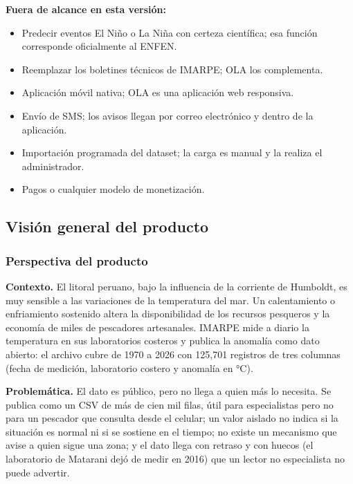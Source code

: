 \documentclass[11pt,a4paper,oneside]{article}
\begin{document}
\textbf{Fuera de alcance en esta versión:}



\begin{itemize}[leftmargin=1.4em, itemsep=2pt]
\item Predecir eventos El Niño o La Niña con certeza científica; esa función corresponde oficialmente al ENFEN.
\item Reemplazar los boletines técnicos de IMARPE; OLA los complementa.
\item Aplicación móvil nativa; OLA es una aplicación web responsiva.
\item Envío de SMS; los avisos llegan por correo electrónico y dentro de la aplicación.
\item Importación programada del dataset; la carga es manual y la realiza el administrador.
\item Pagos o cualquier modelo de monetización.
\end{itemize}


\subsection{Visión general del producto}

\subsubsection{Perspectiva del producto}

\textbf{Contexto.} El litoral peruano, bajo la influencia de la corriente de Humboldt, es muy sensible a las variaciones de la temperatura del mar. Un calentamiento o enfriamiento sostenido altera la disponibilidad de los recursos pesqueros y la economía de miles de pescadores artesanales. IMARPE mide a diario la temperatura en sus laboratorios costeros y publica la anomalía como dato abierto: el archivo cubre de 1970 a 2026 con 125,701 registros de tres columnas (fecha de medición, laboratorio costero y anomalía en °C).



\textbf{Problemática.} El dato es público, pero no llega a quien más lo necesita. Se publica como un CSV de más de cien mil filas, útil para especialistas pero no para un pescador que consulta desde el celular; un valor aislado no indica si la situación es normal ni si se sostiene en el tiempo; no existe un mecanismo que avise a quien sigue una zona; y el dato llega con retraso y con huecos (el laboratorio de Matarani dejó de medir en 2016) que un lector no especialista no puede advertir.
\end{document}
